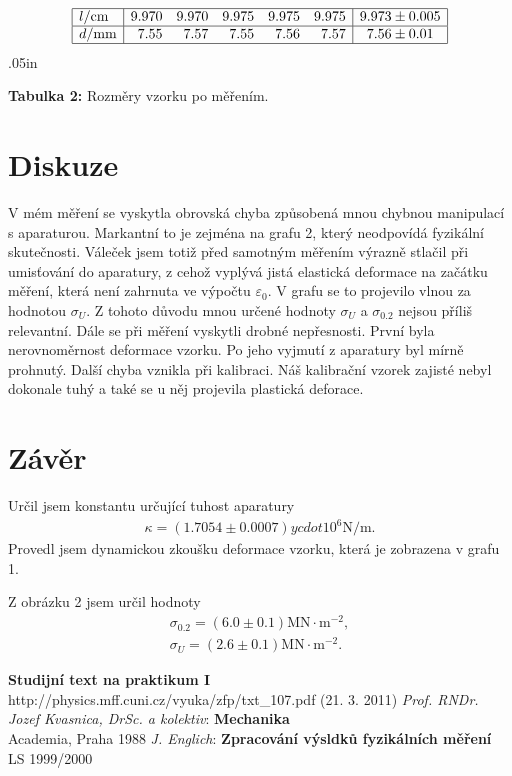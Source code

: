 \documentclass[a4paper,12pt]{article}
\begin{document}
$$
\begin{array}{|l|rrrrr|c|}
\hline
	l/\mbox{cm}&	9.970&	9.970&	9.975&	9.975&	9.975&	9.973 \pm 0.005	\\ \hline
	d/\mbox{mm}&	7.55&	7.57&	7.55&	7.56&	7.57&	7.56 \pm 0.01	\\ \hline
\end{array}
$$
\vglue.05in
\begin{center}
	\textbf{Tabulka 2:} Rozměry vzorku po měřením.
\end{center}

\section{Diskuze}
\noindent
V mém měření se vyskytla obrovská chyba způsobená mnou chybnou manipulací s aparaturou.
Markantní to je zejména na grafu 2, který neodpovídá fyzikální skutečnosti. Váleček jsem 
totiž před samotným měřením výrazně stlačil při umisťování do aparatury, z cehož vyplývá 
jistá elastická deformace na začátku měření, která není zahrnuta ve výpočtu $\varepsilon_0$.
V grafu se to projevilo vlnou za hodnotou $\sigma_U$. Z tohoto důvodu mnou určené hodnoty 
$\sigma_U$ a $\sigma_{0.2}$ nejsou příliš relevantní. Dále se při měření vyskytli drobné  
nepřesnosti. První byla nerovnoměrnost deformace vzorku. Po jeho vyjmutí z aparatury byl 
mírně prohnutý. Další chyba vznikla při kalibraci. Náš kalibrační vzorek zajisté nebyl 
dokonale tuhý a také se u  něj projevila plastická deforace. 

\section{Závěr}
\noindent
Určil jsem konstantu určující tuhost aparatury
\begin{eqnarray}
		\kappa=(1.7054 \pm 0.0007)ycdot 10^6 \mbox{N/m}.
\end{eqnarray}
Provedl jsem dynamickou zkoušku deformace vzorku, která je zobrazena v grafu 1.

\noindent
Z obrázku 2 jsem určil hodnoty
\begin{eqnarray}
	\sigma_{0.2}=(6.0 \pm 0.1) \mbox{MN}\cdot\mbox{m}^{-2}, \\ 
	\sigma_U=(2.6 \pm 0.1) \mbox{MN}\cdot\mbox{m}^{-2}.
\end{eqnarray}

\begin{thebibliography}{5}
	 \textbf{Studijní text na praktikum I} \\http://physics.mff.cuni.cz/vyuka/zfp/txt\_107.pdf (21. 3. 2011)
	 \emph{Prof. RNDr. Jozef Kvasnica, DrSc. a kolektiv}: \textbf{Mechanika}\\ Academia, Praha 1988
	 \emph{J. Englich}: \textbf{Zpracování výsldků fyzikálních měření} \\ LS 1999/2000
\end{thebibliography}
\end{document}
